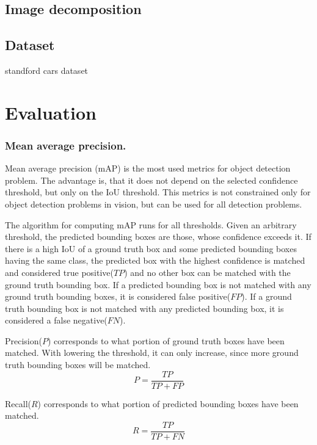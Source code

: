 \documentclass[a4paper,12pt,titlepage]{article}
\numberwithin{figure}{section}
\begin{document}
\subsection{Image decomposition}
\label{sec:decomposition}

\subsection{Dataset}
\label{sec:ssd-dataset}
standford \cite{standford} cars dataset




\section{Evaluation}



\subsubsection{Mean average precision.}
\label{sec:mAP}
Mean average precision (mAP) is the most used metrics for object detection problem. The advantage is, that it does not depend on the selected confidence threshold, but only on the IoU threshold. This metrics is not constrained only for object detection problems in vision, but can be used for all detection problems. 

The algorithm for computing mAP runs for all thresholds. Given an arbitrary threshold, the predicted bounding boxes are those, whose confidence exceeds it. If there is a high IoU of a ground truth box and some predicted bounding boxes having the same class, the predicted box with the highest confidence is matched and considered true positive($TP$) and no other box can be matched with the ground truth bounding box. If a predicted bounding box is not matched with any ground truth bounding boxes, it is considered false positive($FP$). If a ground truth bounding box is not matched with any predicted bounding box, it is considered a false negative($FN$).

Precision($P$) corresponds to what portion of ground truth boxes have been matched. With lowering the threshold, it can only increase, since more ground truth bounding boxes will be matched.
\begin{equation}
P = \frac{TP}{TP + FP}
\end{equation}

Recall($R$) corresponds to what portion of predicted bounding boxes have been matched. 
\begin{equation}
R = \frac{TP}{TP + FN}
\end{equation}
\end{document}
